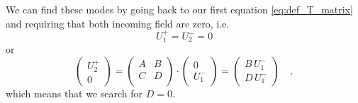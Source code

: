We can find these modes by going back to our first equation \ref{eq:def_T_matrix} and requiring that both incoming field are zero, i.e. 
\begin{equation}
U_1^+ = U_2^- = 0
\end{equation}
or
\begin{equation}
\begin{pmatrix}
U_2^+ \\ 0
\end{pmatrix}
= 
\begin{pmatrix}
A & B \\ C & D \\
\end{pmatrix}
\cdot
\begin{pmatrix}
0 \\ U_1^-
\end{pmatrix}
= 
\begin{pmatrix}
B \, U_1^- \\ D \, U_1^-
\end{pmatrix} \quad ,
\end{equation}
which means that we search for $D =0$. 

